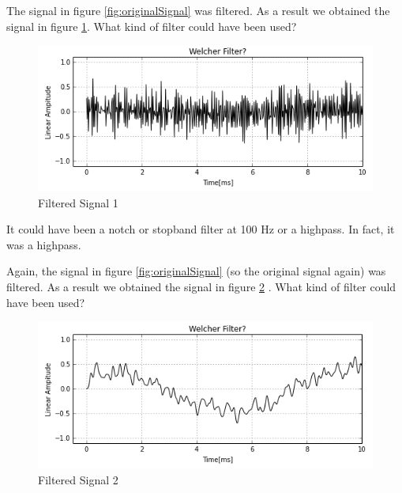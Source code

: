 \begin{question}
	The signal in figure \ref{fig:originalSignal} was filtered. As a result we obtained the signal in figure \ref{fig:filtered1}. What kind of filter could have been used?
	\begin{figure}[H]
	\begin{center}
		\includegraphics[width = 14cm]{raetsel_highpass.png}
		\caption{Filtered Signal 1}
		\label{fig:filtered1}
	\end{center}
	\end{figure}
\end{question}

\begin{Answer}
	It could have been a notch or stopband filter at 100 Hz or a highpass. In fact, it was a highpass.
\end{Answer}


\begin{question}
	Again, the signal in figure \ref{fig:originalSignal} (so the original signal again) was filtered. As a result we obtained the signal in figure \ref{fig:raetsel_2} . What kind of filter could have been used?
\begin{figure}[H]
	\begin{center}
		\includegraphics[width = 14cm]{raetsel_lowpass.png}
		\caption{Filtered Signal 2}
		\label{fig:raetsel_2}
	\end{center}
\end{figure}

\end{question}



